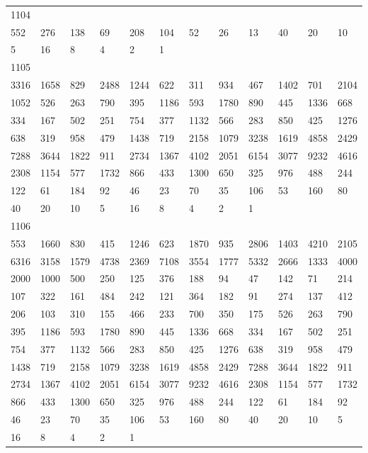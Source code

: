 \begin{longtable}{llllllllllll}
1104&&&&&&&&&&&\\
552& 276& 138& 69& 208& 104& 52& 26& 13& 40& 20& 10\\
5& 16& 8& 4& 2& 1& \\

1105&&&&&&&&&&&\\
3316& 1658& 829& 2488& 1244& 622& 311& 934& 467& 1402& 701& 2104\\
1052& 526& 263& 790& 395& 1186& 593& 1780& 890& 445& 1336& 668\\
334& 167& 502& 251& 754& 377& 1132& 566& 283& 850& 425& 1276\\
638& 319& 958& 479& 1438& 719& 2158& 1079& 3238& 1619& 4858& 2429\\
7288& 3644& 1822& 911& 2734& 1367& 4102& 2051& 6154& 3077& 9232& 4616\\
2308& 1154& 577& 1732& 866& 433& 1300& 650& 325& 976& 488& 244\\
122& 61& 184& 92& 46& 23& 70& 35& 106& 53& 160& 80\\
40& 20& 10& 5& 16& 8& 4& 2& 1& \\

1106&&&&&&&&&&&\\
553& 1660& 830& 415& 1246& 623& 1870& 935& 2806& 1403& 4210& 2105\\
6316& 3158& 1579& 4738& 2369& 7108& 3554& 1777& 5332& 2666& 1333& 4000\\
2000& 1000& 500& 250& 125& 376& 188& 94& 47& 142& 71& 214\\
107& 322& 161& 484& 242& 121& 364& 182& 91& 274& 137& 412\\
206& 103& 310& 155& 466& 233& 700& 350& 175& 526& 263& 790\\
395& 1186& 593& 1780& 890& 445& 1336& 668& 334& 167& 502& 251\\
754& 377& 1132& 566& 283& 850& 425& 1276& 638& 319& 958& 479\\
1438& 719& 2158& 1079& 3238& 1619& 4858& 2429& 7288& 3644& 1822& 911\\
2734& 1367& 4102& 2051& 6154& 3077& 9232& 4616& 2308& 1154& 577& 1732\\
866& 433& 1300& 650& 325& 976& 488& 244& 122& 61& 184& 92\\
46& 23& 70& 35& 106& 53& 160& 80& 40& 20& 10& 5\\
16& 8& 4& 2& 1& \\


\end{longtable}
